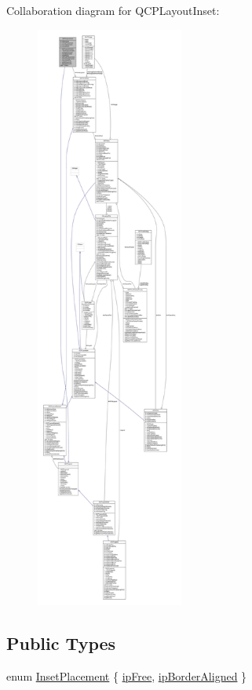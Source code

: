 Collaboration diagram for Q\+C\+P\+Layout\+Inset\+:\nopagebreak
\begin{figure}[H]
\begin{center}
\leavevmode
\includegraphics[height=550pt]{class_q_c_p_layout_inset__coll__graph}
\end{center}
\end{figure}
\subsection*{Public Types}
\begin{DoxyCompactItemize}
\item 
enum \hyperlink{class_q_c_p_layout_inset_a8b9e17d9a2768293d2a7d72f5e298192}{Inset\+Placement} \{ \hyperlink{class_q_c_p_layout_inset_a8b9e17d9a2768293d2a7d72f5e298192aa4802986ea2cea457f932b115acba59e}{ip\+Free}, 
\hyperlink{class_q_c_p_layout_inset_a8b9e17d9a2768293d2a7d72f5e298192aa81e7df4a785ddee2229a8f47c46e817}{ip\+Border\+Aligned}
 \}
\end{DoxyCompactItemize}

